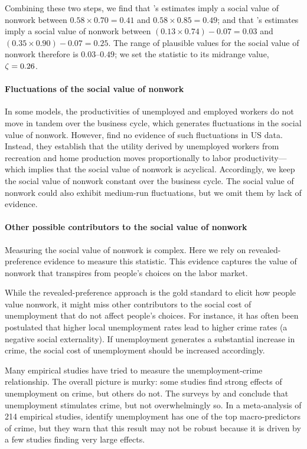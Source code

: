 \documentclass[letterpaper,12pt,leqno]{article}
\begin{document}
Combining these two steps, we find that 's estimates imply a social value of nonwork between $0.58 \times 0.70 = 0.41$ and $0.58 \times 0.85 = 0.49$; and that 's estimates imply a social value of nonwork between $(0.13 \times 0.74)-0.07 = 0.03$ and $(0.35 \times 0.90)-0.07 = 0.25$. The range of plausible values for the social value of nonwork therefore is $0.03$--$0.49$; we set the statistic to its midrange value, $\zeta=0.26$.

\paragraph{Fluctuations of the social value of nonwork}  In some models, the productivities of unemployed and employed workers do not move in tandem over the business cycle, which generates fluctuations in the social value of nonwork. However,  find no evidence of such fluctuations in US data. Instead, they establish that the utility derived by unemployed workers from recreation and home production moves proportionally to labor productivity---which implies that the social value of nonwork is acyclical. Accordingly, we keep the social value of nonwork constant over the business cycle. The social value of nonwork could also exhibit medium-run fluctuations, but we omit them by lack of evidence.

\paragraph{Other possible contributors to the social value of nonwork} Measuring the social value of nonwork is complex. Here we rely on revealed-preference evidence to measure this statistic. This evidence captures the value of nonwork that transpires from  people's choices on the labor market. 

While the revealed-preference approach is the gold standard to elicit how people value nonwork, it might miss other contributors to the social cost of unemployment that do not affect people's choices. For instance, it has often been postulated that higher local unemployment rates lead to higher crime rates (a negative social externality). If unemployment generates a substantial increase in crime, the social cost of unemployment should be increased accordingly.

Many empirical studies have tried to measure the unemployment-crime relationship. The overall picture is murky: some studies find strong effects of unemployment on crime, but others do not. The surveys by  and  conclude that unemployment stimulates crime, but not overwhelmingly so. In a meta-analysis of 214 empirical studies,  identify unemployment has one of the top macro-predictors of crime, but they warn that this result may not be robust because it is driven by a few studies finding very large effects. 
\end{document}
